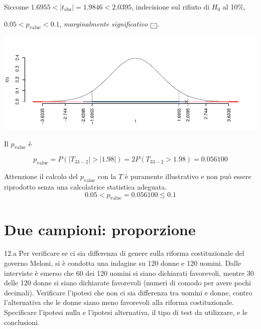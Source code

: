 \documentclass[
  11pt,
]{book}
\theoremstyle{mytheoremstyle}
\theoremstyle{mydefstyle}
\newenvironment{sol}
  {
  \begin{tcolorbox}[enhanced,breakable,arc=0.1mm,boxrule=1pt,colback=white,colframe=iblue,
  title=\bf \fontfamily{lmss}\selectfont \hspace{.5 cm} Soluzione,drop fuzzy shadow]

}{
\end{tcolorbox}
  }
\begin{document}
\begin{sol}
Siccome \(1.6955<|t_\text{obs}|=1.9846<2.0395\), indecisione sul rifiuto di \(H_0\) al 10\%,

\(0.05<p_\text{value}<0.1\), \emph{marginalmente significativo} \(\fbox{.}\).

\begin{center}\includegraphics{Esami_passati_con_soluzioni_files/figure-latex/05-test-15,-1} \end{center}

Il \(p_{\text{value}}\) è

\[ p_{\text{value}} = P(|T_{33-2}|>|1.98|)=2P(T_{33-2}>1.98)=0.056100 \]

Attenzione il calcolo del \(p_\text{value}\) con la \(T\) è puramente illustrativo e non può essere riprodotto senza una calcolatrice statistica adeguata.\[
 0.05 < p_\text{value}= 0.056100 \leq 0.1 
\]

\end{sol}

\section{Due campioni: proporzione}\label{due-campioni-proporzione}

12.a Per verificare se ci sia differenza di genere sulla
riforma costituzionale del governo Meloni, si è condotta una
indagine su 120 donne e 120 uomini.
Dalle interviste è emerso che 60 dei 120 uomini si siano
dichiarati favorevoli, mentre 30 delle 120 donne si siano
dichiarate favorevoli (numeri di comodo per avere pochi decimali).
Verificare l'ipotesi
che non ci sia differenza tra uomini e donne, contro l'alternativa
che le donne siano meno favorevoli alla riforma costituzionale.
Specificare l'ipotesi nulla e l'ipotesi alternativa,
il tipo di test da utilizzare, e le conclusioni.
\end{document}
